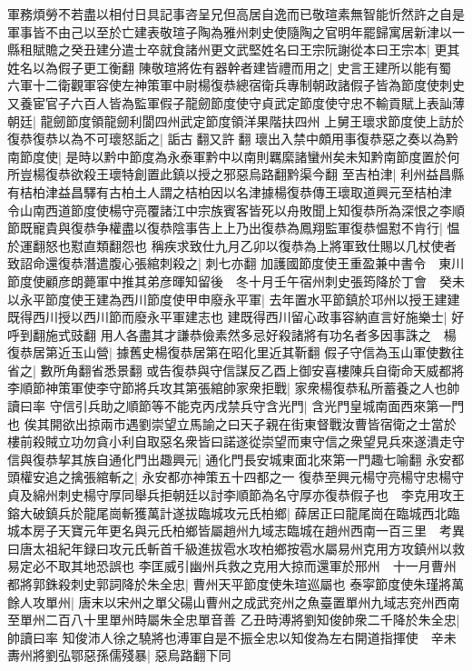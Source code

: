 軍務煩勞不若盡以相付日具記事咨呈兄但高居自逸而已敬瑄素無智能忻然許之自是軍事皆不由己以至於亡建表敬瑄子陶為雅州刺史使隨陶之官明年罷歸寓居新津以一縣租賦贍之癸丑建分遣士卒就食諸州更文武堅姓名曰王宗阮謝從本曰王宗本|{
	更其姓名以為假子更工衡翻}
陳敬瑄將佐有器幹者建皆禮而用之|{
	史言王建所以能有蜀}
六軍十二衛觀軍容使左神策軍中尉楊復恭總宿衛兵專制朝政諸假子皆為節度使刺史又養宦官子六百人皆為監軍假子龍劒節度使守貞武定節度使守忠不輸貢賦上表訕薄朝廷|{
	龍劒節度領龍劒利閬四州武定節度領洋果階扶四州}
上舅王瓌求節度使上訪於復恭復恭以為不可瓌怒詬之|{
	詬古翻又許翻}
瓌出入禁中頗用事復恭惡之奏以為黔南節度使|{
	是時以黔中節度為永泰軍黔中以南則羈縻諸蠻州矣未知黔南節度置於何所豈楊復恭欲殺王瓌特創置此鎮以授之邪惡烏路翻黔渠今翻}
至吉柏津|{
	利州益昌縣有桔柏津益昌驛有古柏土人謂之桔柏因以名津據楊復恭傳王瓌取道興元至桔柏津}
令山南西道節度使楊守亮覆諸江中宗族賓客皆死以舟敗聞上知復恭所為深恨之李順節既寵貴與復恭争權盡以復恭陰事告上上乃出復恭為鳳翔監軍復恭愠懟不肯行|{
	愠於運翻怒也懟直類翻怨也}
稱疾求致仕九月乙卯以復恭為上將軍致仕賜以几杖使者致詔命還復恭潛遣腹心張綰刺殺之|{
	刺七亦翻}
加護國節度使王重盈兼中書令　東川節度使顧彦朗薨軍中推其弟彦暉知留後　冬十月壬午宿州刺史張筠降於丁會　癸未以永平節度使王建為西川節度使甲申廢永平軍|{
	去年置水平節鎮於邛州以授王建建既得西川授以西川節而廢永平軍建志也}
建既得西川留心政事容納直言好施樂士|{
	好呼到翻施式豉翻}
用人各盡其才謙恭儉素然多忌好殺諸將有功名者多因事誅之　楊復恭居第近玉山營|{
	據舊史楊復恭居第在昭化里近其靳翻}
假子守信為玉山軍使數往省之|{
	數所角翻省悉景翻}
或告復恭與守信謀反乙酉上御安喜樓陳兵自衛命天威都將李順節神策軍使李守節將兵攻其第張綰帥家衆拒戰|{
	家衆楊復恭私所蓄養之人也帥讀曰率}
守信引兵助之順節等不能克丙戌禁兵守含光門|{
	含光門皇城南面西來第一門也}
俟其開欲出掠兩市遇劉崇望立馬諭之曰天子親在街東督戰汝曹皆宿衛之士當於樓前殺賊立功勿貪小利自取惡名衆皆曰諾遂從崇望而東守信之衆望見兵來遂潰走守信與復恭挈其族自通化門出趣興元|{
	通化門長安城東面北來第一門趣七喻翻}
永安都頭權安追之擒張綰斬之|{
	永安都亦神策五十四都之一}
復恭至興元楊守亮楊守忠楊守貞及綿州刺史楊守厚同舉兵拒朝廷以討李順節為名守厚亦復恭假子也　李克用攻王鎔大破鎮兵於龍尾崗斬獲萬計遂拔臨城攻元氏柏鄉|{
	薛居正曰龍尾崗在臨城西北臨城本房子天寶元年更名與元氏柏鄉皆屬趙州九域志臨城在趙州西南一百三里　考異曰唐太祖紀年録曰攻元氏斬首千級進拔雹水攻柏鄉按雹水屬易州克用方攻鎮州以救易定必不取其地恐誤也}
李匡威引幽州兵救之克用大掠而還軍於邢州　十一月曹州都將郭銖殺刺史郭詞降於朱全忠|{
	曹州天平節度使朱瑄巡屬也}
泰寜節度使朱瑾將萬餘人攻單州|{
	唐末以宋州之單父碭山曹州之成武兖州之魚臺置單州九域志兖州西南至單州二百八十里單州時屬朱全忠單音善}
乙丑時溥將劉知俊帥衆二千降於朱全忠|{
	帥讀曰率}
知俊沛人徐之驍將也溥軍自是不振全忠以知俊為左右開道指揮使　辛未夀州將劉弘鄂惡孫儒殘暴|{
	惡烏路翻下同}
